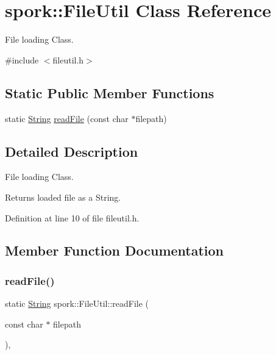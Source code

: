 \hypertarget{classspork_1_1_file_util}{}\section{spork\+:\+:File\+Util Class Reference}
\label{classspork_1_1_file_util}


File loading Class.  




{\ttfamily \#include $<$fileutil.\+h$>$}

\subsection*{Static Public Member Functions}
\begin{DoxyCompactItemize}
\item 
static \hyperlink{my_string_8h_afbeda3fd1bdc8c37d01bdf9f5c8274ff}{String} \hyperlink{classspork_1_1_file_util_aec98e761c52e25558e3cf59207a20ecb}{read\+File} (const char $\ast$filepath)
\end{DoxyCompactItemize}


\subsection{Detailed Description}
File loading Class. 

Returns loaded file as a String. 

Definition at line 10 of file fileutil.\+h.



\subsection{Member Function Documentation}
\mbox{\label{classspork_1_1_file_util_aec98e761c52e25558e3cf59207a20ecb}} 
\subsubsection{\texorpdfstring{read\+File()}{readFile()}}
{\footnotesize\ttfamily static \hyperlink{my_string_8h_afbeda3fd1bdc8c37d01bdf9f5c8274ff}{String} spork\+::\+File\+Util\+::read\+File (\begin{DoxyParamCaption}\item[{const char $\ast$}]{filepath }\end{DoxyParamCaption})\hspace{0.3cm}{\ttfamily [inline]}, {\ttfamily [static]}}



